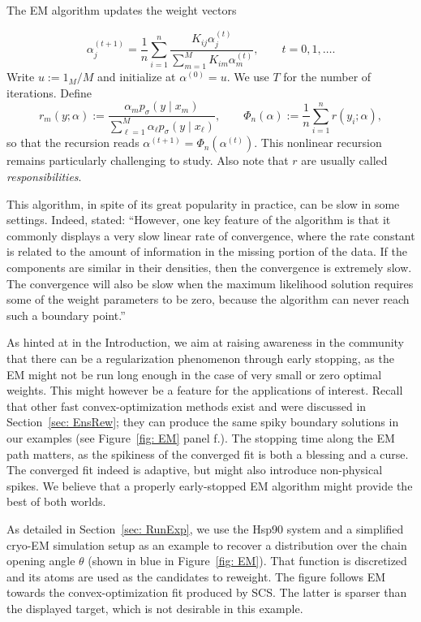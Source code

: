 \documentclass[12pt]{iopart}
\theoremstyle{remark}
\begin{document}
The EM algorithm updates the weight vectors

\begin{equation}
\label{eq: Upd}
\alpha_j^{(t+1)}
=\frac1n\sum_{i=1}^n
\frac{K_{ij}\alpha_j^{(t)}}
{\sum_{m=1}^M K_{im}\alpha_m^{(t)}},
\qquad t=0,1,\ldots .
\end{equation}
Write $u:=1_M/M$ and initialize at $\alpha^{(0)}=u$. We use $T$ for the
number of iterations. Define
\begin{equation}
\label{eq: Resp}
r_m(y;\alpha):=\frac{\alpha_mp_\sigma(y\mid x_m)}
{\sum_{\ell=1}^M\alpha_\ell p_\sigma(y\mid x_\ell)},\qquad
\Phi_n(\alpha):=\frac1n\sum_{i=1}^nr(y_i;\alpha), 
\end{equation}
so that the recursion reads $\alpha^{(t+1)}=\Phi_n(\alpha^{(t)})$.
This nonlinear recursion remains particularly challenging to study. Also note that $r$ are usually called \emph{responsibilities}. 


This algorithm, in spite of its great popularity in practice, can be slow in some settings. Indeed,  \citet[p.~64]{lindsay1995mixture} stated: 
``However, one key feature of the algorithm is that it commonly displays a
very slow linear rate of convergence, where the rate constant is related to the
amount of information in the missing portion of the data. If the components
are similar in their densities, then the convergence is extremely slow. The
convergence will also be slow when the maximum likelihood solution requires
some of the weight parameters to be zero, because the algorithm can never
reach such a boundary point.''


 
 As hinted at in the Introduction, we aim at raising awareness in the community that there can be a regularization phenomenon through early stopping, as the EM might not be run long enough in the case of very small or zero optimal weights.  This might however be a feature for the applications of interest.  Recall that other fast convex-optimization methods exist and were discussed in Section~\ref{sec: EnsRew}; they can produce the same spiky boundary solutions in our examples (see Figure~\ref{fig: EM} panel f.). The stopping time along the EM path matters, as the spikiness of the converged fit is both a blessing and a curse. The converged fit indeed is adaptive, but might also introduce non-physical spikes. We believe that a properly early-stopped EM algorithm might provide the best of both worlds.


As detailed in Section~\ref{sec: RunExp}, we use the Hsp90 system and a simplified cryo-EM simulation setup as an example to recover a distribution over the chain opening angle $\theta$ (shown in blue in Figure~\ref{fig: EM}). That function is discretized and its atoms are used as the candidates to reweight. The figure follows EM towards the convex-optimization fit produced by SCS. The latter is sparser than the displayed target, which is not desirable in this example.
\end{document}
